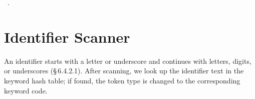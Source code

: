 \documentclass[11pt,a4paper,twoside,openright,DIV=15]{scrbook}
\theoremstyle{definition}
\theoremstyle{plain}
\theoremstyle{remark}
\newcommand{\stdref}[1]{\S\,#1}
\begin{document}
\begin{flushleft}
\begin{minipage}{\linewidth}
\vspace{-1.5ex}
\footnotesize
\begin{list}{}{\setlength{\itemsep}{-\parsep}\setlength{\itemindent}{-\leftmargin}}
\item \NWtxtMacroRefIn\ .

\item{}
\end{list}
\end{minipage}\vspace{4ex}
\end{flushleft}
\section{Identifier Scanner}

An identifier starts with a letter or underscore and continues with
letters, digits, or underscores (\stdref{6.4.2.1}).  After scanning,
we look up the identifier text in the keyword hash table; if found,
the token type is changed to the corresponding keyword code.
\end{document}
